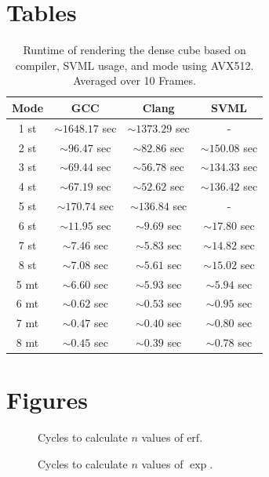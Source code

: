 \documentclass[a4paper, 11pt]{memoir}
\newcommand*{\erf}{\text{erf}}
\begin{document}
    \appendix
    \chapter{Tables}
    \label{ch:tables}
    \begin{table}[H]
        \centering
        \begin{tabular}{|c | c | c | c|}
            \hline
            Mode & GCC               & Clang & SVML\\\hline
            1 st & $\sim1648.17$ sec & $\sim1373.29$ sec & - \\
            2 st & $\sim96.47$ sec   & $\sim82.86$ sec   & $\sim150.08$ sec\\
            3 st & $\sim69.44$ sec   & $\sim56.78$ sec   & $\sim134.33$ sec\\
            4 st & $\sim67.19$ sec   & $\sim52.62$ sec   & $\sim136.42$ sec\\
            5 st & $\sim170.74$ sec  & $\sim136.84$ sec  & - \\
            6 st & $\sim11.95$ sec   & $\sim9.69$ sec    & $\sim17.80$ sec\\
            7 st & $\sim7.46$ sec    & $\sim5.83$ sec    & $\sim14.82$ sec\\
            8 st & $\sim7.08$ sec    & $\sim5.61$ sec    & $\sim15.02$ sec\\\hline\hline

            5 mt & $\sim6.60$ sec    & $\sim5.93$ sec    & $\sim5.94$ sec\\
            6 mt & $\sim0.62$ sec    & $\sim0.53$ sec    & $\sim0.95$ sec\\
            7 mt & $\sim0.47$ sec    & $\sim0.40$ sec    & $\sim0.80$ sec\\
            8 mt & $\sim0.45$ sec    & $\sim0.39$ sec    & $\sim0.78$ sec\\
            \hline
        \end{tabular}
        \caption{Runtime of rendering the dense cube based on compiler, SVML usage, and mode using AVX512. Averaged over 10 Frames.}
        \label{tab:perf_dense_cube_avx512}
    \end{table}

    \chapter{Figures}
    \begin{figure}[H]
        \centering
        
        \caption{Cycles to calculate $n$ values of $\erf$.}
    \end{figure}
    \begin{figure}[H]
        \centering
        
        \caption{Cycles to calculate $n$ values of $\exp$.}
    \end{figure}
    
\end{document}
